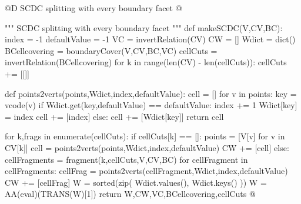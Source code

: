 @D SCDC splitting with every boundary facet
@{""" SCDC splitting with every boundary facet """
def makeSCDC(V,CV,BC):
	index = -1
	defaultValue = -1
	VC = invertRelation(CV)
	CW = []
	Wdict = dict()
	BCellcovering = boundaryCover(V,CV,BC,VC)
	cellCuts = invertRelation(BCellcovering)
	for k in range(len(CV) - len(cellCuts)): cellCuts += [[]]
	
	def points2verts(points,Wdict,index,defaultValue):
		cell = []
		for v in points:
			key = vcode(v)
			if Wdict.get(key,defaultValue) == defaultValue:
				index += 1
				Wdict[key] = index
				cell += [index]
			else: 
				cell += [Wdict[key]]
		return cell
	
	for k,frags in enumerate(cellCuts):
		if cellCuts[k] == []:
			points = [V[v] for v in CV[k]]
			cell = points2verts(points,Wdict,index,defaultValue)
			CW += [cell]
		else:
			cellFragments = fragment(k,cellCuts,V,CV,BC)
			for cellFragment in cellFragments:
				cellFrag = points2verts(cellFragment,Wdict,index,defaultValue)
				CW += [cellFrag]
	W = sorted(zip( Wdict.values(), Wdict.keys() ))
	W = AA(eval)(TRANS(W)[1])
	return W,CW,VC,BCellcovering,cellCuts
@}
